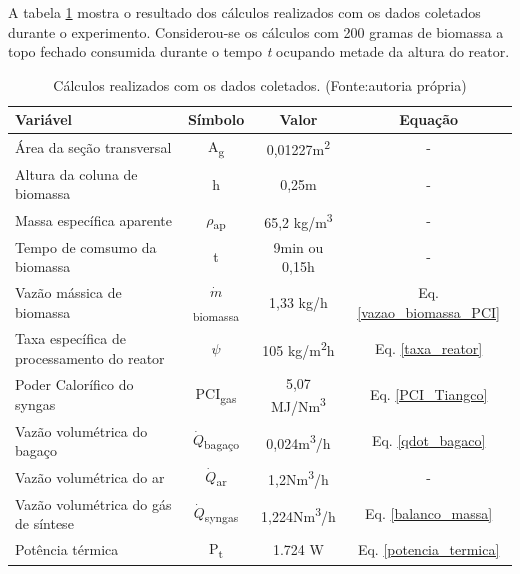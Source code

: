 A tabela \ref{tabela_resultados_2} mostra o resultado dos cálculos realizados com os dados coletados durante o experimento. Considerou-se os cálculos com 200 gramas de biomassa a topo fechado consumida durante o tempo \textit{t} ocupando metade da altura do reator.

\begin{table}[h]
	\centering
	\caption{Cálculos realizados com os dados coletados. (Fonte:autoria própria)}
	\begin{tabular}{|l|c|c|c|}
		\hline
		Variável & Símbolo & Valor & Equação \\
		\hline
		
		Área da seção transversal & A\textsubscript{g} & 0,01227m\textsuperscript{2} & - \\
		
		Altura da coluna de biomassa & h & 0,25m & -\\
		
		Massa específica aparente & $\rho$\textsubscript{ap} & 65,2 kg/m\textsuperscript{3} & - \\
		
		Tempo de comsumo da biomassa & t & 9min ou 0,15h & -\\
		
		Vazão mássica de biomassa & $\dot{m}$\textsubscript{biomassa} & 1,33 kg/h & Eq. \ref{vazao_biomassa_PCI}\\
		
		Taxa específica de processamento do reator & $\psi$ & 105 kg/m\textsuperscript{2}h & Eq. \ref{taxa_reator}\\
		
		\rowcolor{lightgray} Poder Calorífico do syngas & PCI\textsubscript{gas} & 5,07 MJ/Nm\textsuperscript{3} & Eq. \ref{PCI_Tiangco}\\
		
		Vazão volumétrica do bagaço & $\dot{Q}$\textsubscript{bagaço} & 0,024m\textsuperscript{3}/h & Eq. \ref{qdot_bagaco}\\
		
		Vazão volumétrica do ar & $\dot{Q}$\textsubscript{ar} & 1,2Nm\textsuperscript{3}/h & -\\
		
		Vazão volumétrica do gás de síntese & $\dot{Q}$\textsubscript{syngas} & 1,224Nm\textsuperscript{3}/h & Eq. \ref{balanco_massa}\\
		
		\rowcolor{lightgray} Potência térmica & P\textsubscript{t} & 1.724 W & Eq. \ref{potencia_termica}\\
		
		\hline
\end{tabular}
\label{tabela_resultados_2}
\end{table}	

